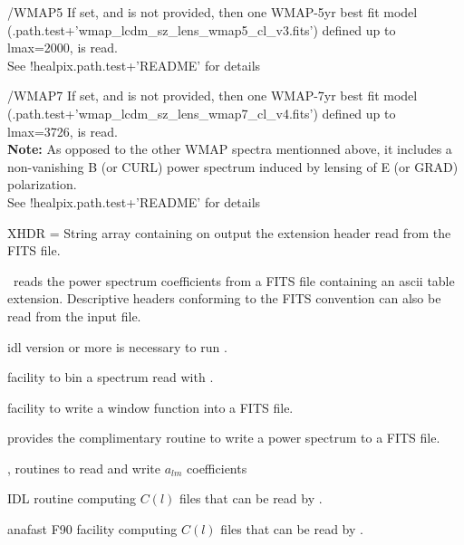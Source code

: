 \begin{keywords}
\begin{kwlist}{}
%
    \item[/WMAP5] %
           If set, and 
           is not provided, then one WMAP-5yr best fit
          model (.path.test+\-'wmap\_lcdm\_sz\_lens\_wmap5\_cl\_v3.fits') 
          defined up to lmax=2000, is read.\\
          See !healpix.path.test+'README' for details
%
    \item[/WMAP7] %
           If set, and 
           is not provided, then one WMAP-7yr best fit
          model (.path.test+\-'wmap\_lcdm\_sz\_lens\_wmap7\_cl\_v4.fits') 
          defined up to lmax=3726, is read.\\
          {\bf Note:} As opposed to the other WMAP spectra mentionned above, it includes
             a non-vanishing B (or CURL) power spectrum 
             induced by lensing of E (or GRAD) polarization.\\
          See !healpix.path.test+'README' for details
%
    \item[XHDR =] %
	String array containing on output the extension header
      read from the FITS file. 
  \end{kwlist}
\end{keywords}  

\begin{codedescription}
{\thedocid\ reads the power spectrum coefficients from a FITS
file containing an ascii table extension. Descriptive headers conforming
to the FITS convention can also be read from the input file.
}
\end{codedescription}



\begin{related}
  \begin{sulist}{} %
    \item[idl] version \idlversion or more is necessary to run \thedocid.
    \item[\htmlref{bin\_llcl}{idl:bin_llcl}] facility to bin a spectrum read
with \thedocid.
    \item[\htmlref{bl2fits}{idl:bl2fits}] facility to write a window function into a FITS file.
    \item[\htmlref{cl2fits}{idl:cl2fits}] provides the complimentary routine to write a
      power spectrum to a FITS file.
    \item[\htmlref{fits2alm}{idl:fits2alm}, \htmlref{alm2fits}{idl:alm2fits}] routines to read and write $a_{lm}$ coefficients
    \item[\htmlref{ianafast}{idl:ianafast}] IDL routine computing $C(l)$ files
that can be read by \thedocid.
    \item[anafast] F90 facility computing $C(l)$ files that can be read by \thedocid.
  \end{sulist}
\end{related}

